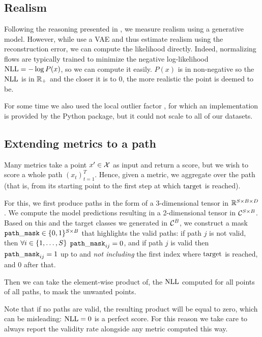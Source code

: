 \documentclass[../main.tex]{subfiles}
\begin{document}
\subsection{Realism}

Following the reasoning presented in \cite{vanlooverenInterpretable2021}, we measure realism using a generative model.
However, while \citeauthor{vanlooverenInterpretable2021} use a VAE and thus estimate realism using the reconstruction error, we can compute the likelihood directly.
Indeed, normalizing flows are typically trained to minimize the negative log-likelihood $\text{NLL} = - \log P(x)$, so we can compute it easily.
$P(x)$ is in non-negative so the $\text{NLL}$ is in $\mathbb{R}_+$ and the closer it is to 0, the more realistic the point is deemed to be.

For some time we also used the local outlier factor \cite{breunigLOF2000}, for which an implementation is provided by the \sklearn{} Python package, but it could not scale to all of our datasets.

\subsection{Extending metrics to a path}

Many metrics take a point $x' \in \mathcal{X}$ as input and return a score, but we wish to score a whole path $(x_t)_{t=1}^T$.
Hence, given a metric, we aggregate over the path (that is, from its starting point to the first step at which $\mathrm{target}$ is reached).

For this, we first produce paths in the form of a 3-dimensional tensor in $\mathbb{R}^{S \times B \times D}$.
We compute the model predictions resulting in a 2-dimensional tensor in $\mathcal{C}^{S \times B}$.
Based on this and the target classes we generated in $\mathcal{C}^B$, we construct a mask $\mathtt{path\_mask} \in \{0, 1\}^{S \times B}$ that highlights the valid paths:
if path $j$ is not valid, then
$\forall i \in \{1, \ldots, S\}$ ${\mathtt{path\_mask}_{ij} = 0}$, and if path $j$ is valid then $\mathtt{path\_mask}_{ij} = 1$ up to and \emph{not including} the first index where $\mathrm{target}$ is reached, and 0 after that.

Then we can take the element-wise product of, \eg{} the $\text{NLL}$ computed for all points of all paths, to mask the unwanted points.

Note that if no paths are valid, the resulting product will be equal to zero, which can be misleading: $\text{NLL} = 0$ is a perfect score.
For this reason we take care to always report the validity rate alongside any metric computed this way.
\end{document}
